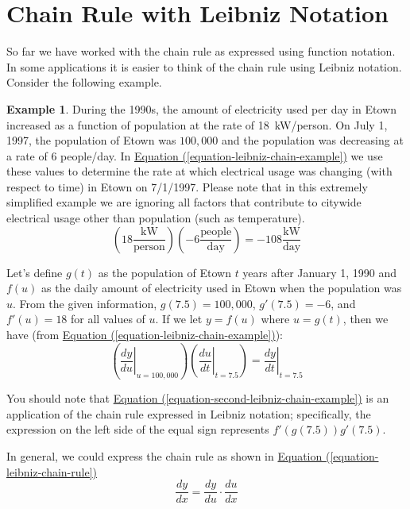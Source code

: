 \documentclass[12pt,]{book}
\theoremstyle{plain}
\theoremstyle{definition}
\newtheorem{example}[theorem]{Example}
\numberwithin{equation}{section}
\newcommand{\fe}[2]{#1\mathopen{}\left(#2\right)\mathclose{}}
\newcommand{\fd}[1]{#1'}
\newcommand{\lz}[2]{\frac{d#1}{d#2}}
\newcommand{\lzoa}[3]{\left.{\frac{d#1}{d#2}}\right|_{#3}}
\begin{document}
\section[Chain Rule with Leibniz Notation]{Chain Rule with Leibniz Notation}\label{section-chain-rule-and-leibniz}
So far we have worked with the chain rule as expressed using function notation.  In some applications it is easier to think of the chain rule using Leibniz notation. Consider the following example.%
\begin{example}\label{example-17}
During the 1990s, the amount of electricity used per day in Etown increased as a function of population at the rate of \SI{18}{\kilo\watt}/person.  On July 1, 1997, the population of Etown was \(100{,}000\) and the population was decreasing at a rate of 6 people/day.  In \hyperref[equation-leibniz-chain-example]{Equation (\ref{equation-leibniz-chain-example})} we use these values to determine the rate at which electrical usage was changing (with respect to time) in Etown on 7/1/1997.  Please note that in this extremely simplified example we are ignoring all factors that contribute to citywide electrical usage other than population (such as temperature).%
\begin{equation}\left(18\frac{\text{kW}}{\text{person}}\right)\left(-6\frac{\text{people}}{\text{day}}\right)=-108\frac{\text{kW}}{\text{day}}\label{equation-leibniz-chain-example}\end{equation}\par
Let's define \(\fe{g}{t}\)  as the population of Etown \(t\) years after January 1, 1990 and \(\fe{f}{u}\) as the daily amount of electricity used in Etown when the population was \(u\).  From the given information, \(\fe{g}{7.5}=100{,}000\), \(\fe{\fd{g}}{7.5}=-6\), and \(\fe{\fd{f}}{u}=18\) for all values of \(u\).  If we let \(y=\fe{f}{u}\) where \(u=\fe{g}{t}\), then we have (from \hyperref[equation-leibniz-chain-example]{Equation (\ref{equation-leibniz-chain-example})}):%
\begin{equation}\left(\lzoa{y}{u}{u=100{,}000}\right)\left(\lzoa{u}{t}{t=7.5}\right)=\lzoa{y}{t}{t=7.5}\label{equation-second-leibniz-chain-example}\end{equation}\par
You should note that \hyperref[equation-second-leibniz-chain-example]{Equation (\ref{equation-second-leibniz-chain-example})} is an application of the chain rule expressed in Leibniz notation; specifically, the expression on the left side of the equal sign represents \(\fe{\fd{f}}{\fe{g}{7.5}}\fe{\fd{g}}{7.5}\).%
\end{example}
\par
In general, we could express the chain rule as shown in \hyperref[equation-leibniz-chain-rule]{Equation (\ref{equation-leibniz-chain-rule})}%
\begin{equation}\lz{y}{x}=\lz{y}{u}\cdot\lz{u}{x}\label{equation-leibniz-chain-rule}\end{equation}\typeout{************************************************}
\typeout{************************************************}
\end{document}
